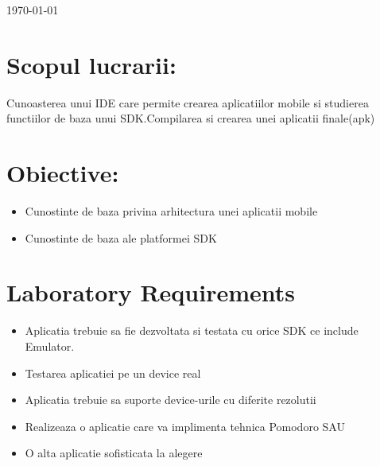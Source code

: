 \documentclass[12pt]{article}
\begin{document}
\begin{titlepage}

{\large \today}\\[2cm] %


\vfill %

\end{titlepage}
\section{Scopul lucrarii:}
Cunoasterea unui IDE care permite crearea aplicatiilor mobile si studierea functiilor de baza unui SDK.Compilarea si crearea unei aplicatii finale(apk) 
\section{Obiective:}
\begin{itemize}
\item Cunostinte de baza privina arhitectura unei aplicatii mobile
\item Cunostinte de baza ale platformei SDK
\end{itemize}
\section{Laboratory Requirements}
\begin{itemize}
\item Aplicatia trebuie sa fie dezvoltata si testata cu orice SDK ce include Emulator.
\item Testarea aplicatiei pe un device real
\item Aplicatia trebuie sa suporte device-urile cu diferite rezolutii
\item Realizeaza o aplicatie care va implimenta tehnica Pomodoro SAU
\item O alta aplicatie sofisticata la alegere
\end{itemize}


\label{sec:examples}
\end{document}
